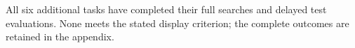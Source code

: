 \noindent All six additional tasks have completed their full searches and delayed test evaluations. None meets the stated display criterion; the complete outcomes are retained in the appendix.\par
